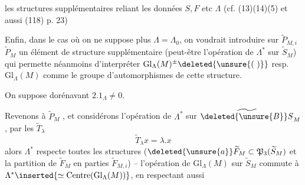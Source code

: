 les structures supplémentaires reliant les données $S,F$ etc  $\Lambda$ (cf. (13)(14)(5) et aussi (118) p. 23)

Enfin, dans le cas où on ne suppose plus $\Lambda=\Lambda_0$, on voudrait introduire sur $\widetilde P_{M,i}$  $\widetilde P_M$ un élément de structure supplémentaire (peut-être l'opération de $\Lambda^*$ sur $\widetilde S_M$) qui permette néanmoins d'interpréter $\mathrm{Gl}_\Lambda(M)^{\pm}\deleted{\unsure{(\ )}}$ resp. $\mathrm{Gl}_\Lambda(M)$ comme le groupe d'automorphismes de cette structure.

 On suppose dorénavant $2.1_\Lambda\ne0$.

Revenons à $\widetilde P_M$ , et considérons l'opération de $\Lambda^*$ sur $\widetilde{\deleted{\unsure{B}}S}_M$, par les $\widetilde T_\lambda$
\[
 \widetilde T_\lambda x=\lambda.x\tag*{(20)}
\]
alors $\Lambda^*$ respecte toutes les structures ($\deleted{\unsure{a}}\widetilde F_M\subset\mathfrak P_3(\widetilde S_M)$ et la partition de $\widetilde F_M$ en parties $\widetilde F_{M,i}$) -- l'opération de $\mathrm{Gl}_\Lambda(M)$ sur $\widetilde S_M$  commute à $\Lambda^*\inserted{\simeq\operatorname{Centre}(\mathrm{Gl}_\Lambda(M))}$, en respectant aussi
